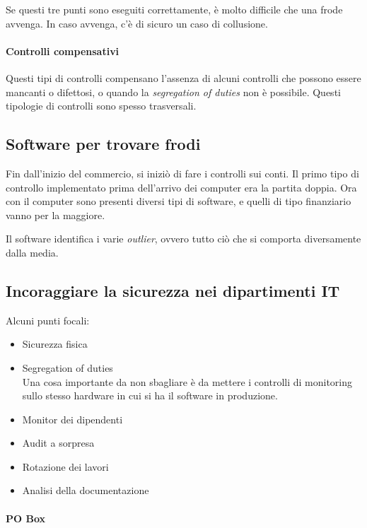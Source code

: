 Se questi tre punti sono eseguiti correttamente, è molto difficile che una 
frode avvenga. In caso avvenga, c'è di sicuro un caso di collusione.

\paragraph*{Controlli compensativi}

Questi tipi di controlli compensano l'assenza di alcuni controlli che possono 
essere mancanti o difettosi, o quando la \textit{segregation of duties} non è 
possibile. Questi tipologie di controlli sono spesso trasversali.

\subsection{Software per trovare frodi}

Fin dall'inizio del commercio, si iniziò di fare i controlli sui conti. Il 
primo tipo di controllo implementato prima dell'arrivo dei computer era la 
partita doppia. Ora con il computer sono presenti diversi tipi di software, e 
quelli di tipo finanziario vanno per la maggiore.

Il software identifica i varie \textit{outlier}, ovvero tutto ciò che si 
comporta diversamente dalla media.

\subsection{Incoraggiare la sicurezza nei dipartimenti IT}

Alcuni punti focali:
\begin{itemize}
  \item Sicurezza fisica
  \item Segregation of duties \\
  Una cosa importante da non sbagliare è da mettere i controlli di monitoring 
  sullo stesso hardware in cui si ha il software in produzione.
  \item Monitor dei dipendenti
  \item Audit a sorpresa
  \item Rotazione dei lavori
  \item Analisi della documentazione
\end{itemize}

\paragraph*{PO Box}

